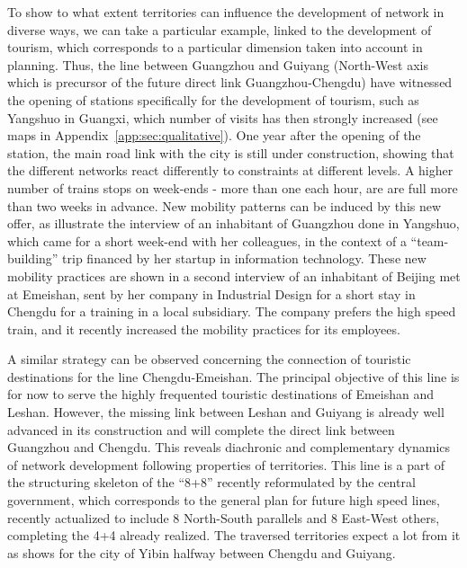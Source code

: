 To show to what extent territories can influence the development of network in diverse ways, we can take a particular example, linked to the development of tourism, which corresponds to a particular dimension taken into account in planning. Thus, the line between Guangzhou and Guiyang (North-West axis which is precursor of the future direct link Guangzhou-Chengdu) have witnessed the opening of stations specifically for the development of tourism, such as Yangshuo in Guangxi, which number of visits has then strongly increased (see maps in Appendix~\ref{app:sec:qualitative}). One year after the opening of the station, the main road link with the city is still under construction, showing that the different networks react differently to constraints at different levels. A higher number of trains stops on week-ends - more than one each hour, are are full more than two weeks in advance. New mobility patterns can be induced by this new offer, as illustrate the interview of an inhabitant of Guangzhou done in Yangshuo, which came for a short week-end with her colleagues, in the context of a ``team-building'' trip financed by her startup in information technology. These new mobility practices are shown in a second interview of an inhabitant of Beijing met at Emeishan, sent by her company in Industrial Design for a short stay in Chengdu for a training in a local subsidiary. The company prefers the high speed train, and it recently increased the mobility practices for its employees.

A similar strategy can be observed concerning the connection of touristic destinations for the line Chengdu-Emeishan. The principal objective of this line is for now to serve the highly frequented touristic destinations of Emeishan and Leshan. However, the missing link between Leshan and Guiyang is already well advanced in its construction and will complete the direct link between Guangzhou and Chengdu. This reveals diachronic and complementary dynamics of network development following properties of territories. This line is a part of the structuring skeleton of the ``8+8'' recently reformulated by the central government, which corresponds to the general plan for future high speed lines, recently actualized to include 8 North-South parallels and 8 East-West others, completing the 4+4 already realized.  The traversed territories expect a lot from it as shows \cite{lu2012chengdu} for the city of Yibin halfway between Chengdu and Guiyang.

